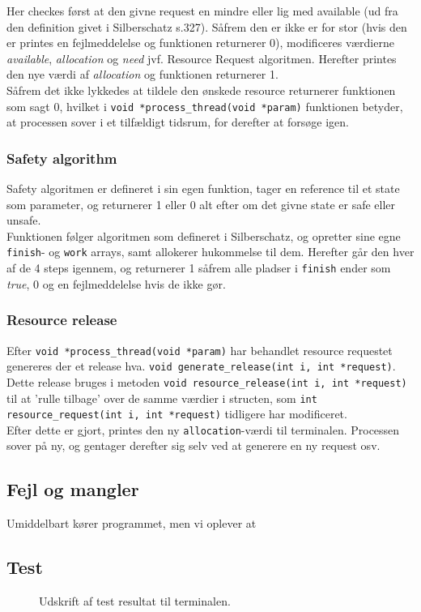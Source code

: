 \documentclass[main.tex]{subfile}
\begin{document}
Her checkes først at den givne request en mindre eller lig med available (ud fra den definition givet i Silberschatz s.327). Såfrem den er ikke er for stor (hvis den er printes en fejlmeddelelse og funktionen returnerer 0), modificeres værdierne \textit{available}, \textit{allocation} og \textit{need} jvf. Resource Request algoritmen. Herefter printes den nye værdi af \textit{allocation} og funktionen returnerer 1.\\

Såfrem det ikke lykkedes at tildele den ønskede resource returnerer funktionen som sagt 0, hvilket i \texttt{void *process\_thread(void *param)} funktionen betyder, at processen sover i et tilfældigt tidsrum, for derefter at forsøge igen.

\subsubsection{Safety algorithm}
Safety algoritmen er defineret i sin egen funktion, tager en reference til et state som parameter, og returnerer 1 eller 0 alt efter om det givne state er safe eller unsafe.\\

Funktionen følger algoritmen som defineret i Silberschatz, og opretter sine egne \texttt{finish}- og \texttt{work} arrays, samt allokerer hukommelse til dem. Herefter går den hver af de 4 steps igennem, og returnerer 1 såfrem alle pladser i \texttt{finish} ender som \textit{true}, 0 og en fejlmeddelelse hvis de ikke gør.

\subsubsection{Resource release}
Efter \texttt{void *process\_thread(void *param)} har behandlet resource requestet genereres der et release hva. \texttt{void generate\_release(int i, int *request)}. Dette release bruges i metoden \texttt{void resource\_release(int i, int *request)} til at 'rulle tilbage' over de samme værdier i structen, som \texttt{int resource\_request(int i, int *request)} tidligere har modificeret.\\

Efter dette er gjort, printes den ny \texttt{allocation}-værdi til terminalen. Processen sover på ny, og gentager derefter sig selv ved at generere en ny request osv.

\subsection{Fejl og mangler}
Umiddelbart kører programmet, men vi oplever at 

\subsection{Test}

\begin{figure}[H]
\center
{}
\caption{Udskrift af test resultat til terminalen.}
\label{fig:opg2\_2\_test}
\end{figure}
\end{document}
